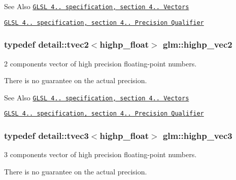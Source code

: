 \begin{DoxySeeAlso}{See Also}
\href{http://www.opengl.org/registry/doc/GLSLangSpec.4.20.8.pdf}{\tt G\-L\-S\-L 4.. specification, section 4.. Vectors} 

\href{http://www.opengl.org/registry/doc/GLSLangSpec.4.20.8.pdf}{\tt G\-L\-S\-L 4.. specification, section 4.. Precision Qualifier} 
\end{DoxySeeAlso}
\hypertarget{group__core__precision_ga0747567a49e0fa00ecd05011c1645d69}{
\subsubsection[{highp\-\_\-vec2}]{\setlength{\rightskip}{0pt plus 5cm}typedef detail\-::tvec2$<$highp\-\_\-float$>$ {\bf glm\-::highp\-\_\-vec2}}}\label{group__core__precision_ga0747567a49e0fa00ecd05011c1645d69}


2 components vector of high precision floating-\/point numbers. 

There is no guarantee on the actual precision.

\begin{DoxySeeAlso}{See Also}
\href{http://www.opengl.org/registry/doc/GLSLangSpec.4.20.8.pdf}{\tt G\-L\-S\-L 4.. specification, section 4.. Vectors} 

\href{http://www.opengl.org/registry/doc/GLSLangSpec.4.20.8.pdf}{\tt G\-L\-S\-L 4.. specification, section 4.. Precision Qualifier} 
\end{DoxySeeAlso}
\hypertarget{group__core__precision_gab660f8916a9c4a72bf71cd4279ae19fb}{
\subsubsection[{highp\-\_\-vec3}]{\setlength{\rightskip}{0pt plus 5cm}typedef detail\-::tvec3$<$highp\-\_\-float$>$ {\bf glm\-::highp\-\_\-vec3}}}\label{group__core__precision_gab660f8916a9c4a72bf71cd4279ae19fb}


3 components vector of high precision floating-\/point numbers. 

There is no guarantee on the actual precision.

